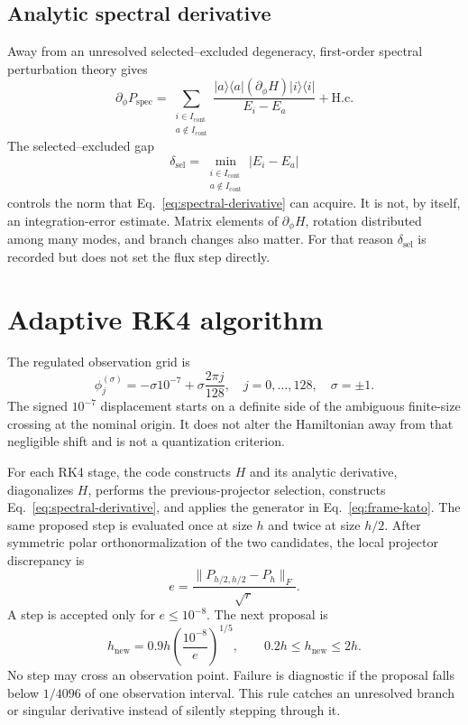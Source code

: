 \documentclass[aps,prb,twocolumn,floatfix,nofootinbib,superscriptaddress]{revtex4-2}
\begin{document}
\subsection{Analytic spectral derivative}

Away from an unresolved selected--excluded degeneracy, first-order spectral
perturbation theory gives
\begin{equation}
  \partial_\phi P_{\mathrm{spec}}
  =\sum_{\substack{i\in I_{\mathrm{cont}}\\a\notin I_{\mathrm{cont}}}}
  \frac{|a\rangle\langle a|(\partial_\phi H)|i\rangle\langle i|}
  {E_i-E_a}+\mathrm{H.c.}
  \label{eq:spectral-derivative}
\end{equation}
The selected--excluded gap
\begin{equation}
  \delta_{\mathrm{sel}}=
  \min_{\substack{i\in I_{\mathrm{cont}}\\a\notin I_{\mathrm{cont}}}}
  |E_i-E_a|
  \label{eq:selected-gap}
\end{equation}
controls the norm that Eq.~\eqref{eq:spectral-derivative} can acquire.  It is
not, by itself, an integration-error estimate.  Matrix elements of
$\partial_\phi H$, rotation distributed among many modes, and branch changes
also matter.  For that reason $\delta_{\mathrm{sel}}$ is recorded but does not
set the flux step directly.

\section{Adaptive RK4 algorithm}

The regulated observation grid is
\begin{equation}
  \phi_j^{(\sigma)}=-\sigma10^{-7}
  +\sigma\frac{2\pi j}{128},
  \quad j=0,\ldots,128,
  \quad \sigma=\pm1.
  \label{eq:grid}
\end{equation}
The signed $10^{-7}$ displacement starts on a definite side of the ambiguous
finite-size crossing at the nominal origin.  It does not alter the Hamiltonian
away from that negligible shift and is not a quantization criterion.

For each RK4 stage, the code constructs $H$ and its analytic derivative,
diagonalizes $H$, performs the previous-projector selection, constructs
Eq.~\eqref{eq:spectral-derivative}, and applies the generator in
Eq.~\eqref{eq:frame-kato}.  The same proposed step is evaluated once at size
$h$ and twice at size $h/2$.  After symmetric polar orthonormalization of the
two candidates, the local projector discrepancy is
\begin{equation}
  e=\frac{\|P_{h/2,h/2}-P_h\|_F}{\sqrt r}.
  \label{eq:step-error}
\end{equation}
A step is accepted only for $e\le10^{-8}$.  The next proposal is
\begin{equation}
  h_{\mathrm{new}}=0.9h\left(\frac{10^{-8}}{e}\right)^{1/5},
  \qquad 0.2h\le h_{\mathrm{new}}\le2h.
  \label{eq:controller}
\end{equation}
No step may cross an observation point.  Failure is diagnostic if the
proposal falls below $1/4096$ of one observation interval.  This rule catches
an unresolved branch or singular derivative instead of silently stepping
through it.
\end{document}
